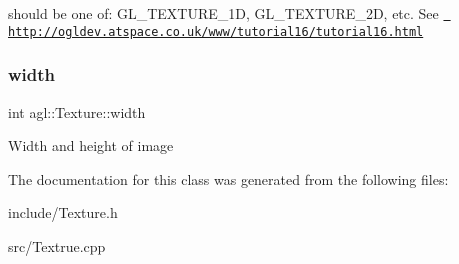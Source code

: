 should be one of\+: G\+L\+\_\+\+T\+E\+X\+T\+U\+R\+E\+\_\+1D, G\+L\+\_\+\+T\+E\+X\+T\+U\+R\+E\+\_\+2D, etc. See \href{http://ogldev.atspace.co.uk/www/tutorial16/tutorial16.html}{\texttt{ http\+://ogldev.\+atspace.\+co.\+uk/www/tutorial16/tutorial16.\+html}} \mbox{\label{classagl_1_1Texture_a77dd6f3abb916a88ce172aff30da4a36}} 
\subsubsection{\texorpdfstring{width}{width}}
{\footnotesize\ttfamily int agl\+::\+Texture\+::width\hspace{0.3cm}{\ttfamily [private]}}

Width and height of image 

The documentation for this class was generated from the following files\+:\begin{DoxyCompactItemize}
\item 
include/Texture.\+h\item 
src/Textrue.\+cpp\end{DoxyCompactItemize}
